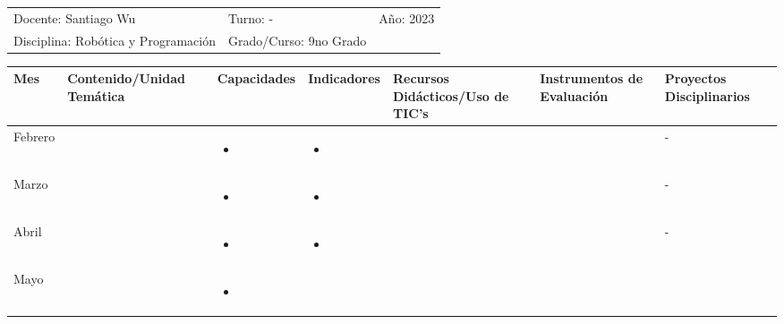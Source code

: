 \documentclass[landscape, a4paper, 10pt]{article}
\newcommand{\smallcellwidth}{0.7in}
\newcommand{\normalcellwidth}{1.2in}
\newcommand{\bigcellwidth}{2.0in}
\newcommand{\profesor}{Santiago Wu}
\newcommand{\discipline}{Robótica y Programación}
\newcommand{\currentyear}{2023}
\begin{document}
	\begin{tabularx}{\textwidth}{ >{\raggedright\arraybackslash}X >{\raggedright\arraybackslash}X >{\raggedright\arraybackslash}X }
		Docente: \profesor &
		Turno: - &
		Año: \currentyear \\
		Disciplina: \discipline &
		Grado/Curso: 9no Grado &
		 \\
	\end{tabularx}
	\centering
	\begin{longtable}{|m{\smallcellwidth}|p{\normalcellwidth}|p{\bigcellwidth}|p{\bigcellwidth}|p{\normalcellwidth}|p{\normalcellwidth}|p{\normalcellwidth}|}
		\hline
		\textbf{Mes} &
		\textbf{Contenido/Unidad Temática} &
		\textbf{Capacidades} &
		\textbf{Indicadores} &
		\textbf{Recursos Didácticos/Uso de TIC's} &
		\textbf{Instrumentos de Evaluación} &
		\textbf{Proyectos Disciplinarios} \\
		\hline
		\endhead
		Febrero &
		 &
		\begin{itemize}
			\item 
		\end{itemize} &
		\begin{itemize}
			\item 
		\end{itemize} &
		  &
		  &
		 - \\
		\hline
		Marzo &
		 &
		\begin{itemize}
			\item 
		\end{itemize} &
		\begin{itemize}
			\item 
		\end{itemize} &
		  &
		  &
		 - \\
		\hline
		Abril &
		 &
		\begin{itemize}
			\item 
		\end{itemize} &
		\begin{itemize}
			\item 
		\end{itemize} &
		  &
		  &
		 - \\
		\hline
		Mayo &
		 &
		\begin{itemize}
			\item 
		\end{itemize} &
		\begin{itemize}

\end{itemize}
\end{longtable}
\end{document}
